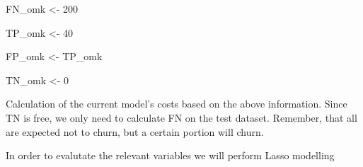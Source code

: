 \documentclass[
  letterpaper,
  DIV=11,
  numbers=noendperiod]{scrartcl}
\newenvironment{Shaded}{\begin{snugshade}}{\end{snugshade}}
\newcommand{\CommentTok}[1]{\textcolor[rgb]{0.37,0.37,0.37}{#1}}
\newcommand{\DecValTok}[1]{\textcolor[rgb]{0.68,0.00,0.00}{#1}}
\newcommand{\FunctionTok}[1]{\textcolor[rgb]{0.28,0.35,0.67}{#1}}
\newcommand{\NormalTok}[1]{\textcolor[rgb]{0.00,0.23,0.31}{#1}}
\newcommand{\OtherTok}[1]{\textcolor[rgb]{0.00,0.23,0.31}{#1}}
\newcommand{\SpecialCharTok}[1]{\textcolor[rgb]{0.37,0.37,0.37}{#1}}
\newcommand{\StringTok}[1]{\textcolor[rgb]{0.13,0.47,0.30}{#1}}
\begin{document}
\begin{Shaded}
\begin{Highlighting}[]
\NormalTok{FN\_omk }\OtherTok{\textless{}{-}} \DecValTok{200} 

\NormalTok{TP\_omk }\OtherTok{\textless{}{-}} \DecValTok{40}

\NormalTok{ FP\_omk }\OtherTok{\textless{}{-}}\NormalTok{ TP\_omk}

\NormalTok{ TN\_omk }\OtherTok{\textless{}{-}} \DecValTok{0}
\end{Highlighting}
\end{Shaded}

Calculation of the current model's costs based on the above information.
Since TN is free, we only need to calculate FN on the test dataset.
Remember, that all are expected not to churn, but a certain portion will
churn.

\begin{Shaded}
\end{Shaded}

In order to evalutate the relevant variables we will perform Lasso
modelling
\end{document}
